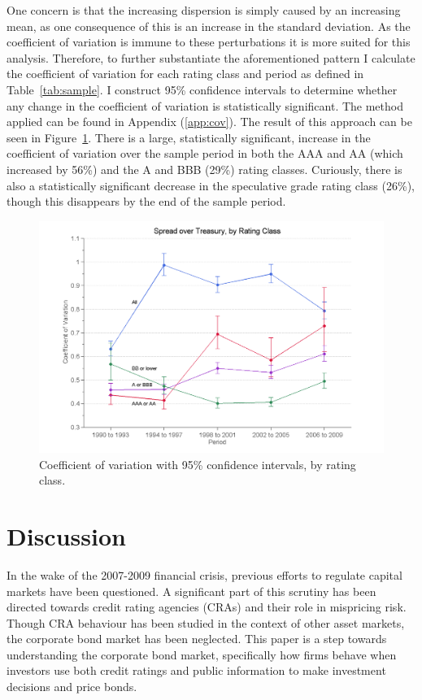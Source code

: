 \documentclass[notitlepage]{article}
\begin{document}
One concern is that the increasing dispersion is simply caused by an increasing mean, as one consequence of this is an increase in the standard deviation. As the coefficient of variation is immune to these perturbations it is more suited for this analysis. Therefore, to further substantiate the aforementioned pattern I calculate the coefficient of variation for each rating class and period as defined in Table~\ref{tab:sample}. I construct 95\% confidence intervals to determine whether any change in the coefficient of variation is statistically significant. The method applied can be found in Appendix (\ref{app:cov}). The result of this approach can be seen in Figure~\ref{fig:cov}. There is a large, statistically significant, increase in the coefficient of variation over the sample period in both the AAA and AA (which increased by 56\%) and the A and BBB (29\%) rating classes. Curiously, there is also a statistically significant decrease in the speculative grade rating class (26\%), though this disappears by the end of the sample period.

\begin{figure}[ht]
\centering
\includegraphics[width=\textwidth]{CVCI.png}
\caption{Coefficient of variation with 95\% confidence intervals, by rating class.}
\label{fig:cov}
\end{figure}

\section{Discussion}
\label{sec:dis}

In the wake of the 2007-2009 financial crisis, previous efforts to regulate capital markets have been questioned. A significant part of this scrutiny has been directed towards credit rating agencies (CRAs) and their role in mispricing risk. Though CRA behaviour has been studied in the context of other asset markets, the corporate bond market has been neglected. This paper is a step towards understanding the corporate bond market, specifically how firms behave when investors use both credit ratings and public information to make investment decisions and price bonds.
\end{document}

